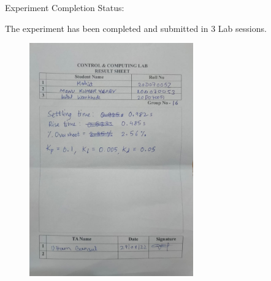 \documentclass[12pt]{report}
\begin{document}
\vspace{20pt}

\begin{Large}
Experiment Completion Status:\\
\end{Large}

The experiment has been completed and submitted in 3 Lab sessions.\\

\begin{figure}[h!]
\center
\includegraphics[width=200pt]{Result.jpeg}
\end{figure}
\end{document}
